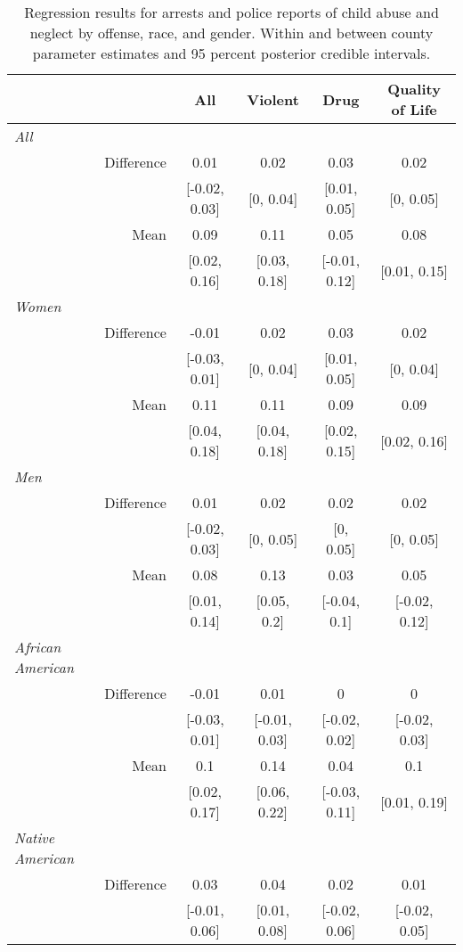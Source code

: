 \begin{table}[ht]
\centering
\caption{Regression results for arrests and police reports of child abuse and neglect by offense, race, and gender. Within and between county parameter estimates and 95 percent posterior credible intervals.} 
\begin{tabular}{lrcccc}
  \hline
  &   & All & Violent & Drug & Quality of Life \\ 
  \hline
{\textit{All}} &  &  &  &  &  \\ 
   & Difference & 0.01 & 0.02 & 0.03 & 0.02 \\ 
   &  & [-0.02, 0.03] & [0, 0.04] & [0.01, 0.05] & [0, 0.05] \\ 
   & Mean & 0.09 & 0.11 & 0.05 & 0.08 \\ 
   &  & [0.02, 0.16] & [0.03, 0.18] & [-0.01, 0.12] & [0.01, 0.15] \\ 
  {\textit{Women}} &  &  &  &  &  \\ 
   & Difference & -0.01 & 0.02 & 0.03 & 0.02 \\ 
   &  & [-0.03, 0.01] & [0, 0.04] & [0.01, 0.05] & [0, 0.04] \\ 
   & Mean & 0.11 & 0.11 & 0.09 & 0.09 \\ 
   &  & [0.04, 0.18] & [0.04, 0.18] & [0.02, 0.15] & [0.02, 0.16] \\ 
  {\textit{Men}} &  &  &  &  &  \\ 
   & Difference & 0.01 & 0.02 & 0.02 & 0.02 \\ 
   &  & [-0.02, 0.03] & [0, 0.05] & [0, 0.05] & [0, 0.05] \\ 
   & Mean & 0.08 & 0.13 & 0.03 & 0.05 \\ 
   &  & [0.01, 0.14] & [0.05, 0.2] & [-0.04, 0.1] & [-0.02, 0.12] \\ 
  {\textit{African American}} &  &  &  &  &  \\ 
   & Difference & -0.01 & 0.01 & 0 & 0 \\ 
   &  & [-0.03, 0.01] & [-0.01, 0.03] & [-0.02, 0.02] & [-0.02, 0.03] \\ 
   & Mean & 0.1 & 0.14 & 0.04 & 0.1 \\ 
   &  & [0.02, 0.17] & [0.06, 0.22] & [-0.03, 0.11] & [0.01, 0.19] \\ 
  {\textit{Native American}} &  &  &  &  &  \\ 
   & Difference & 0.03 & 0.04 & 0.02 & 0.01 \\ 
   &  & [-0.01, 0.06] & [0.01, 0.08] & [-0.02, 0.06] & [-0.02, 0.05] \\ 

\end{tabular}
\end{table}
